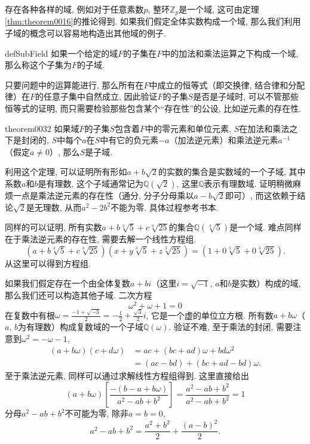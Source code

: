 存在各种各样的域, 例如对于任意素数$p$, 整环$\mathbb{Z}_p$是一个域, 这可由定理\ref{thm:theorem0016}的推论得到. 如果我们假定全体实数构成一个域, 那么我们利用子域的概念可以容易地构造出其他域的例子. 
\begin{definition}{}{defSubField}
如果一个给定的域$F$的子集在$F$中的加法和乘法运算之下构成一个域, 那么称这个子集为$F$的子域. 
\end{definition}

只要问题中的运算能进行, 那么所有在$F$中成立的恒等式（即交换律, 结合律和分配律）在$F$的任意子集中自然成立, 因此验证$F$的子集$S$是否是子域时, 可以不管那些恒等式的证明, 而只需要检验那些包含某个“存在性”的公设, 比如逆元素的存在性. 
\begin{theorem}{}{theorem0032}
如果域$F$的子集$S$包含着$F$中的零元素和单位元素, $S$在加法和乘法之下是封闭的, $S$中每个$a$在$S$中有它的负元素$-a$（加法逆元素）和乘法逆元素$a^{-1}$（假定$a \neq 0$）, 那么$S$是子域. 
\end{theorem}

利用这个定理, 可以证明所有形如$a+b\sqrt{2}$的实数的集合是实数域的一个子域, 其中系数$a$和$b$是有理数, 这个子域通常记为$\mathbb{Q}(\sqrt{2})$, 这里$\mathbb{Q}$表示有理数域. 证明稍微麻烦一点是乘法逆元素的存在性（通分, 分子分母乘以$a-b\sqrt{2}$即可）, 而这依赖于结论$\sqrt{2}$是无理数, 从而$a^2-2b^2$不能为零. 具体过程参考书本. 

同样的可以证明, 所有实数$a + b\sqrt[3]{5} + c\sqrt[3]{25}$的集合$\mathbb{Q}(\sqrt[3]{5})$是一个域. 难点同样在于乘法逆元素的存在性, 需要去解一个线性方程组. 
\[
(a + b\sqrt[3]{5} + c\sqrt[3]{25})(x + y\sqrt[3]{5} + z\sqrt[3]{25}) = (1 + 0\sqrt[3]{5} + 0\sqrt[3]{25}).
\]
从这里可以得到方程组. 

如果我们假定存在一个由全体复数$a+bi$（这里$i=\sqrt{-1}$, $a$和$b$是实数）构成的域, 那么我们还可以构造其他子域. 二次方程
\[
\omega^2 + \omega + 1 = 0
\]
在复数中有根$\omega = \frac{-1 + \sqrt{-3}}{2}=-\frac{1}{2}+\frac{\sqrt{3}}{2}i$, 它是一个虚的单位立方根. 所有数$a+b\omega$（$a$, $b$为有理数）构成复数域的一个子域$\mathbb{Q}(\omega)$. 验证不难, 至于乘法的封闭, 需要注意到$\omega^2 = -\omega-1$, 
\[
\begin{aligned}
(a+b\omega)(c+d\omega) &= ac + (bc+ad)\omega + bd\omega^2\\
&=(ac-bd) + (bc+ad-bd)\omega.
\end{aligned}
\]
至于乘法逆元素, 同样可以通过求解线性方程组得到. 这里直接给出
\[
(a+b\omega)[\frac{-(b-a+b\omega)}{a^2-ab+b^2}]=\frac{a^2-ab+b^2}{a^2-ab+b^2}=1
\]
分母$a^2-ab+b^2$不可能为零, 除非$a=b=0$, 
\[
a^2-ab+b^2 = \frac{a^2+b^2}{2} + \frac{(a-b)^2}{2}.
\]


